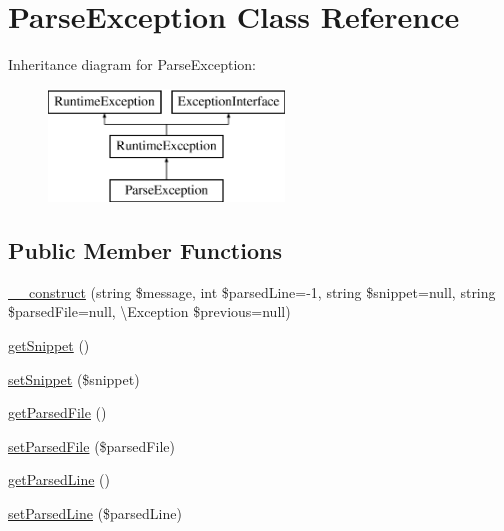 \hypertarget{class_symfony_1_1_component_1_1_yaml_1_1_exception_1_1_parse_exception}{}\section{Parse\+Exception Class Reference}
\label{class_symfony_1_1_component_1_1_yaml_1_1_exception_1_1_parse_exception}
Inheritance diagram for Parse\+Exception\+:\begin{figure}[H]
\begin{center}
\leavevmode
\includegraphics[height=3.000000cm]{class_symfony_1_1_component_1_1_yaml_1_1_exception_1_1_parse_exception}
\end{center}
\end{figure}
\subsection*{Public Member Functions}
\begin{DoxyCompactItemize}
\item 
\mbox{\hyperlink{class_symfony_1_1_component_1_1_yaml_1_1_exception_1_1_parse_exception_a1b7e4cd740513a6e43c5730b0493cb4e}{\+\_\+\+\_\+construct}} (string \$message, int \$parsed\+Line=-\/1, string \$snippet=null, string \$parsed\+File=null, \textbackslash{}Exception \$previous=null)
\item 
\mbox{\hyperlink{class_symfony_1_1_component_1_1_yaml_1_1_exception_1_1_parse_exception_a3577a5cda40bf567864069acc15de9aa}{get\+Snippet}} ()
\item 
\mbox{\hyperlink{class_symfony_1_1_component_1_1_yaml_1_1_exception_1_1_parse_exception_ad02c1878ebacd2bcc4cba29b30d34bdf}{set\+Snippet}} (\$snippet)
\item 
\mbox{\hyperlink{class_symfony_1_1_component_1_1_yaml_1_1_exception_1_1_parse_exception_a9b45ea03698aba0960d95b6cd650531f}{get\+Parsed\+File}} ()
\item 
\mbox{\hyperlink{class_symfony_1_1_component_1_1_yaml_1_1_exception_1_1_parse_exception_ab2218e0a8ed4623aa066bfc463e1ae15}{set\+Parsed\+File}} (\$parsed\+File)
\item 
\mbox{\hyperlink{class_symfony_1_1_component_1_1_yaml_1_1_exception_1_1_parse_exception_a9b38ce4f9248c08d644f4a09688e8ced}{get\+Parsed\+Line}} ()
\item 
\mbox{\hyperlink{class_symfony_1_1_component_1_1_yaml_1_1_exception_1_1_parse_exception_ab210c808bde567ec236e9532bd13b9e5}{set\+Parsed\+Line}} (\$parsed\+Line)
\end{DoxyCompactItemize}


